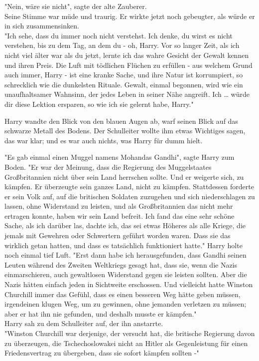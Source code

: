 {"Nein, wäre sie nicht", sagte der alte Zauberer.\\ Seine Stimme war müde und traurig. Er wirkte jetzt noch gebeugter, als würde er in sich zusammensinken.\\ "Ich sehe, dass du immer noch nicht verstehst. Ich denke, du wirst es nicht verstehen, bis zu dem Tag, an dem du - oh, Harry. Vor so langer Zeit, als ich nicht viel älter war als du jetzt, lernte ich das wahre Gesicht der Gewalt kennen und ihren Preis. Die Luft mit tödlichen Flüchen zu erfüllen - aus welchem Grund auch immer, Harry - ist eine kranke Sache, und ihre Natur ist korrumpiert, so schrecklich wie die dunkelsten Rituale. Gewalt, einmal begonnen, wird wie ein unaufhaltsamer Wahnsinn, der jedes Leben in seiner Nähe angreift. Ich … würde dir diese Lektion ersparen, so wie ich sie gelernt habe, Harry."

Harry wandte den Blick von den blauen Augen ab, warf seinen Blick auf das schwarze Metall des Bodens. Der Schulleiter wollte ihm etwas Wichtiges sagen, das war klar; und es war auch nichts, was Harry für dumm hielt.

"Es gab einmal einen Muggel namens Mohandas Gandhi", sagte Harry zum Boden. "Er war der Meinung, dass die Regierung des Muggelstaates Großbritannien nicht über sein Land herrschen sollte. Und er weigerte sich, zu kämpfen. Er überzeugte sein ganzes Land, nicht zu kämpfen. Stattdessen forderte er sein Volk auf, auf die britischen Soldaten zuzugehen und sich niederschlagen zu lassen, ohne Widerstand zu leisten, und als Großbritannien das nicht mehr ertragen konnte, haben wir sein Land befreit. Ich fand das eine sehr schöne Sache, als ich darüber las, dachte ich, das sei etwas Höheres als alle Kriege, die jemals mit Gewehren oder Schwertern geführt worden waren. Dass sie das wirklich getan hatten, und dass es tatsächlich funktioniert hatte." Harry holte noch einmal tief Luft. "Erst dann habe ich herausgefunden, dass Gandhi seinen Leuten während des Zweiten Weltkriegs gesagt hat, dass sie, wenn die Nazis einmarschieren, auch gewaltlosen Widerstand gegen sie leisten sollten. Aber die Nazis hätten einfach jeden in Sichtweite erschossen. Und vielleicht hatte Winston Churchill immer das Gefühl, dass es einen besseren Weg hätte geben müssen, irgendeinen klugen Weg, um zu gewinnen, ohne jemanden verletzen zu müssen; aber er hat ihn nie gefunden, und deshalb musste er kämpfen."\\ Harry sah zu dem Schulleiter auf, der ihn anstarrte.\\ "Winston Churchill war derjenige, der versucht hat, die britische Regierung davon zu überzeugen, die Tschechoslowakei nicht an Hitler als Gegenleistung für einen Friedensvertrag zu übergeben, dass sie sofort kämpfen sollten -"

}
